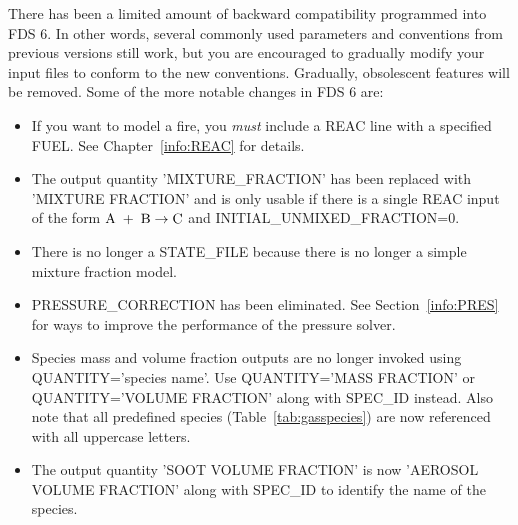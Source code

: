 \documentclass[11pt]{book}
\begin{document}
There has been a limited amount of backward compatibility programmed into FDS 6. In other words, several commonly used parameters and conventions from previous versions still
work, but you are encouraged to gradually modify your input files to conform to the new conventions. Gradually, obsolescent features will be removed. Some of the more notable changes
in FDS 6 are:
\begin{itemize}
\item If you want to model a fire, you {\em must} include a {\ct REAC} line with a specified {\ct FUEL}. See Chapter~\ref{info:REAC} for details.
\item The output quantity {\ct 'MIXTURE\_FRACTION'} has been replaced with {\ct 'MIXTURE FRACTION'} and is only usable if there is a single {\ct REAC} input of the form ${\rm A} \; + \; {\rm B} \rightarrow {\rm C}$ and {\ct INITIAL\_UNMIXED\_FRACTION=0}.
\item There is no longer a {\ct STATE\_FILE} because there is no longer a simple mixture fraction model.
\item {\ct PRESSURE\_CORRECTION} has been eliminated. See Section~\ref{info:PRES} for ways to improve the performance of the pressure solver.
\item Species mass and volume fraction outputs are no longer invoked using {\ct QUANTITY='species name'}. Use {\ct QUANTITY='MASS FRACTION'} or {\ct QUANTITY='VOLUME FRACTION'} along with {\ct SPEC\_ID} instead.  Also note that all predefined species (Table~\ref{tab:gasspecies}) are now referenced with all uppercase letters.
\item The output quantity {\ct 'SOOT VOLUME FRACTION'} is now {\ct 'AEROSOL VOLUME FRACTION'} along with {\ct SPEC\_ID} to identify the name of the species.
\end{itemize}
\end{document}
